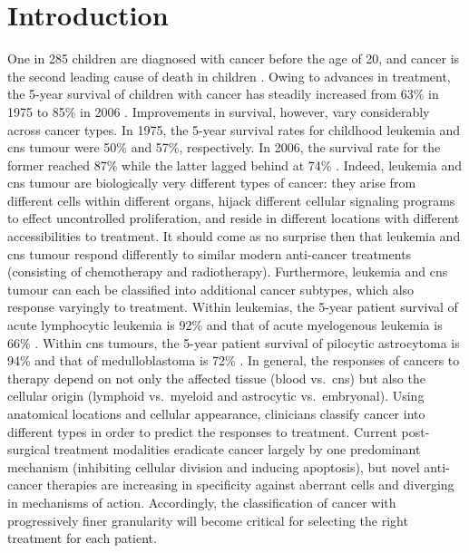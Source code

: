 \chapter{Introduction}
\label{ch:intro}

One in 285 children are diagnosed with cancer before the age of 20, and cancer is the second leading cause of death in children . Owing to advances in treatment, the 5-year survival of children with cancer has steadily increased from 63\% in 1975 to 85\% in 2006 . Improvements in survival, however, vary considerably across cancer types. In 1975, the 5-year survival rates for childhood leukemia and \gls{cns} tumour were 50\% and 57\%, respectively. In 2006, the survival rate for the former reached 87\% while the latter lagged behind at 74\% . Indeed, leukemia and \gls{cns} tumour are biologically very different types of cancer: they arise from different cells within different organs, hijack different cellular signaling programs to effect uncontrolled proliferation, and reside in different locations with different accessibilities to treatment. It should come as no surprise then that leukemia and \gls{cns} tumour respond differently to similar modern anti-cancer treatments (consisting of chemotherapy and radiotherapy). Furthermore, leukemia and \gls{cns} tumour can each be classified into additional cancer subtypes, which also response varyingly to treatment. Within leukemias, the 5-year patient survival of acute lymphocytic leukemia is 92\% and that of acute myelogenous leukemia is 66\% . Within \gls{cns} tumours, the 5-year patient survival of pilocytic astrocytoma is 94\% and that of medulloblastoma is 72\% . In general, the responses of cancers to therapy depend on not only the affected tissue (blood vs.\ \gls{cns}) but also the cellular origin (lymphoid vs.\ myeloid and astrocytic vs.\ embryonal). Using anatomical locations and cellular appearance, clinicians classify cancer into different types in order to predict the responses to treatment. Current post-surgical treatment modalities eradicate cancer largely by one predominant mechanism (inhibiting cellular division and inducing apoptosis), but novel anti-cancer therapies are increasing in specificity against aberrant cells and diverging in mechanisms of action. Accordingly, the classification of cancer with progressively finer granularity will become critical for selecting the right treatment for each patient.

